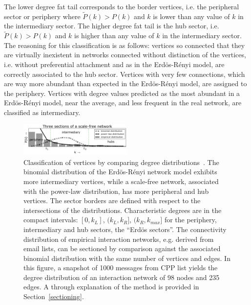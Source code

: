 \documentclass[%
	aip,
	jmp,%
	amsmath,amssymb,
	reprint,%
]{revtex4-1}
\begin{document}
The lower degree fat tail corresponds to the border vertices, i.e. the peripheral sector or periphery where $\widetilde{P}(k)>P(k)$ and $k$ is lower than any value of $k$ in the intermediary sector.
The higher degree fat tail is the hub sector, i.e. $\widetilde{P}(k)>P(k)$ and $k$ is higher than any value of $k$ in the intermediary sector. The reasoning for this classification is as follows: vertices so connected that they are virtually inexistent in networks connected without distinction of the vertices, i.e. without preferential attachment and as in the Erd\"os-R\'enyi model, are correctly associated to the hub sector. Vertices with very few connections, which are way more abundant than expected in the Erd\"os-R\'enyi model, are assigned to the periphery. Vertices with degree values predicted as the most abundant in a Erd\"os-R\'enyi model, near the average, and less frequent in the real network, are classified as intermediary.

\begin{figure}[!h]
	\centering
	\includegraphics[width=0.5\textwidth]{figs/fser__}
	\caption{Classification of vertices by comparing degree
		distributions~\cite{3setores}.
The binomial distribution of the Erd\"os-R\'enyi network model exhibits more intermediary vertices, while a scale-free network, associated with the power-law distribution, has more peripheral and hub vertices. The sector borders are defined with respect to the intersections of the distributions. Characteristic degrees are in the compact intervals: $[0,k_L]$, $(k_L,k_R]$, $(k_R,k_{max}]$ for the periphery, intermediary and hub sectors, the ``Erd\"os sectors''.
																																																																																	The connectivity distribution of empirical interaction networks, e.g. derived from email lists, can be sectioned by comparison against the associated binomial distribution with the same number of vertices and edges. In this figure, a snapshot of 1000 messages from CPP list yields the degree distribution of an interaction network of 98 nodes and 235 edges. A through explanation of the method is provided in Section~\ref{sectioning}.}
																																																																																	\label{fig:setores}
																																																																																\end{figure}
\end{document}
